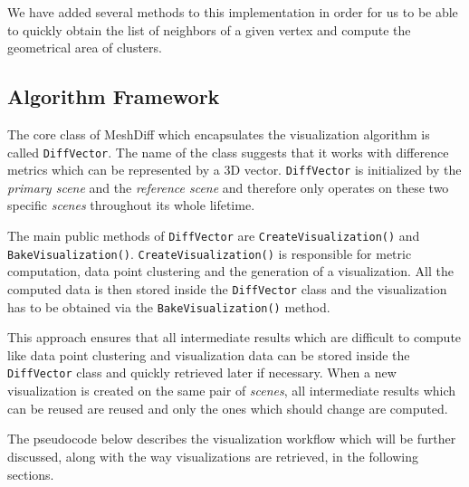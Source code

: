 We have added several methods to this implementation in order for us to be able to quickly obtain the list of neighbors of a given vertex and compute the geometrical area of clusters.

\subsection{Algorithm Framework}
\label{sec:implementation-framework}

The core class of MeshDiff which encapsulates the visualization algorithm is called \verb+DiffVector+. The name of the class suggests that it works with difference metrics which can be represented by a 3D vector. \verb+DiffVector+ is initialized by the {\it primary scene} and the {\it reference scene} and therefore only operates on these two specific {\it scenes} throughout its whole lifetime.

The main public methods of \verb+DiffVector+ are \verb+CreateVisualization()+ and \verb+BakeVisualization()+. \verb+CreateVisualization()+ is responsible for metric computation, data point clustering and the generation of a visualization. All the computed data is then stored inside the \verb+DiffVector+ class and the visualization has to be obtained via the \verb+BakeVisualization()+ method.

This approach ensures that all intermediate results which are difficult to compute like data point clustering and visualization data can be stored inside the \verb+DiffVector+ class and quickly retrieved later if necessary. When a new visualization is created on the same pair of {\it scenes}, all intermediate results which can be reused are reused and only the ones which should change are computed.

The pseudocode below describes the visualization workflow which will be further discussed, along with the way visualizations are retrieved, in the following sections.

